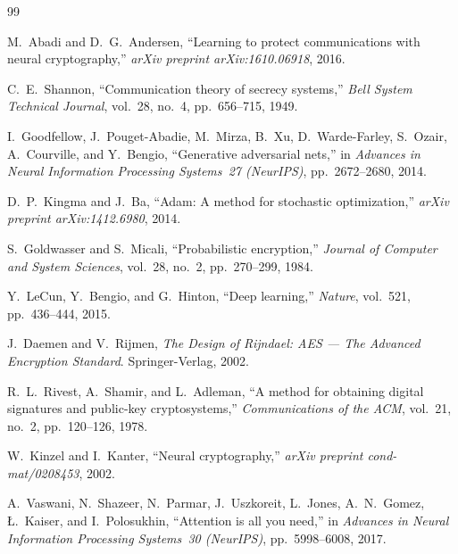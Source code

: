\documentclass[12pt, a4paper]{article}
\begin{document}
\begin{thebibliography}{99}

M.~Abadi and D.~G.~Andersen,
\newblock ``Learning to protect communications with neural cryptography,''
\newblock \textit{arXiv preprint arXiv:1610.06918}, 2016.

C.~E.~Shannon,
\newblock ``Communication theory of secrecy systems,''
\newblock \textit{Bell System Technical Journal},
  vol.~28, no.~4, pp.~656--715, 1949.

I.~Goodfellow, J.~Pouget-Abadie, M.~Mirza, B.~Xu, D.~Warde-Farley,
  S.~Ozair, A.~Courville, and Y.~Bengio,
\newblock ``Generative adversarial nets,''
\newblock in \textit{Advances in Neural Information Processing Systems~27
  (NeurIPS)}, pp.~2672--2680, 2014.

D.~P.~Kingma and J.~Ba,
\newblock ``Adam: A method for stochastic optimization,''
\newblock \textit{arXiv preprint arXiv:1412.6980}, 2014.

S.~Goldwasser and S.~Micali,
\newblock ``Probabilistic encryption,''
\newblock \textit{Journal of Computer and System Sciences},
  vol.~28, no.~2, pp.~270--299, 1984.

Y.~LeCun, Y.~Bengio, and G.~Hinton,
\newblock ``Deep learning,''
\newblock \textit{Nature}, vol.~521, pp.~436--444, 2015.

J.~Daemen and V.~Rijmen,
\newblock \textit{The Design of Rijndael: AES — The Advanced Encryption
  Standard}.
\newblock Springer-Verlag, 2002.

R.~L.~Rivest, A.~Shamir, and L.~Adleman,
\newblock ``A method for obtaining digital signatures and public-key
  cryptosystems,''
\newblock \textit{Communications of the ACM},
  vol.~21, no.~2, pp.~120--126, 1978.

W.~Kinzel and I.~Kanter,
\newblock ``Neural cryptography,''
\newblock \textit{arXiv preprint cond-mat/0208453}, 2002.

A.~Vaswani, N.~Shazeer, N.~Parmar, J.~Uszkoreit, L.~Jones, A.~N.~Gomez,
  \L.~Kaiser, and I.~Polosukhin,
\newblock ``Attention is all you need,''
\newblock in \textit{Advances in Neural Information Processing Systems~30
  (NeurIPS)}, pp.~5998--6008, 2017.

\end{thebibliography}

\end{document}
